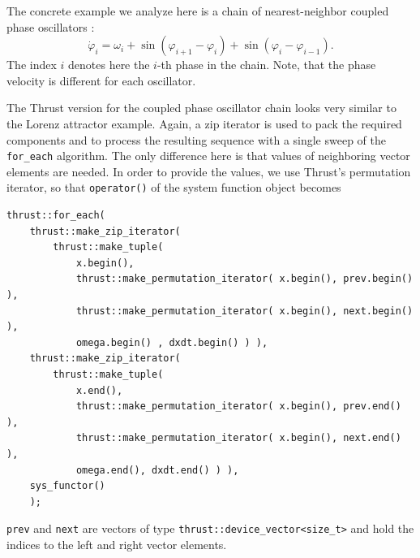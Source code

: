\documentclass[final]{siamltex}
\newcommand{\code}[1]{\lstinline$#1$}
\begin{document}


The concrete example we analyze here is a chain of nearest-neighbor
coupled phase oscillators \cite{Cohen-Rand-Holmes-82}:
\begin{equation} \label{eq:phasesystem}
    \dot{\varphi}_i = \omega_i + \sin( \varphi_{i+1} - \varphi_i) + \sin( \varphi_i
    - \varphi_{i-1}).
\end{equation}
The index $i$ denotes here the $i$-th phase in the chain. Note, that
the phase velocity is different for each oscillator.

The Thrust version for the coupled phase oscillator chain looks very similar to
the Lorenz attractor example. Again, a zip iterator is used to pack the required
components and to process the resulting sequence with a single sweep of the
\code{for_each} algorithm. The only difference here is that values of
neighboring vector elements are needed. In order to provide the values, we use Thrust's
permutation iterator, so that \code{operator()} of the system function object becomes
\begin{lstlisting}
thrust::for_each(
    thrust::make_zip_iterator(
        thrust::make_tuple(
            x.begin(),
            thrust::make_permutation_iterator( x.begin(), prev.begin() ),
            thrust::make_permutation_iterator( x.begin(), next.begin() ),
            omega.begin() , dxdt.begin() ) ),
    thrust::make_zip_iterator(
        thrust::make_tuple(
            x.end(),
            thrust::make_permutation_iterator( x.begin(), prev.end() ),
            thrust::make_permutation_iterator( x.begin(), next.end() ),
            omega.end(), dxdt.end() ) ),
    sys_functor()
    );
\end{lstlisting}
\code{prev} and \code{next} are vectors of type
\code{thrust::device_vector<size_t>} and hold the indices to the left and right
vector elements.
\end{document}
